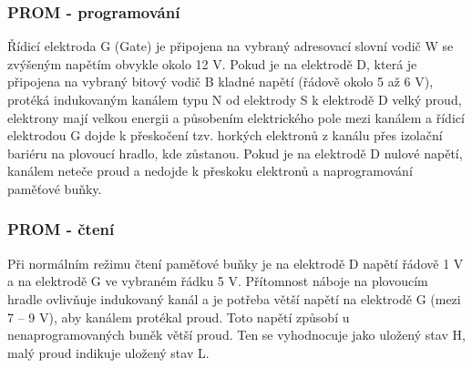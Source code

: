  \subsubsection{PROM - programování}
 Řídicí elektroda G (Gate) je připojena na vybraný adresovací
slovní vodič W se zvýšeným napětím obvykle okolo 12 V. Pokud
je na elektrodě D, která je připojena na vybraný bitový vodič B
kladné napětí (řádově okolo 5 až 6 V), protéká indukovaným
kanálem typu N od elektrody S k elektrodě D velký proud,
elektrony mají velkou energii a působením elektrického pole
mezi kanálem a řídicí elektrodou G dojde k přeskočení tzv.
horkých elektronů z kanálu přes izolační bariéru na plovoucí
hradlo, kde zůstanou. Pokud je na elektrodě D nulové napětí,
kanálem neteče proud a nedojde k přeskoku elektronů a
naprogramování paměťové buňky.

 \subsubsection{PROM - čtení}
 Při normálním režimu čtení paměťové buňky je na
elektrodě D napětí řádově 1 V a na elektrodě G ve
vybraném řádku 5 V. Přítomnost náboje na
plovoucím hradle ovlivňuje indukovaný kanál a je
potřeba větší napětí na elektrodě G (mezi 7 – 9 V),
aby kanálem protékal proud.
Toto napětí způsobí u nenaprogramovaných buněk
větší proud. Ten se vyhodnocuje jako uložený stav
H, malý proud indikuje uložený stav L.




























